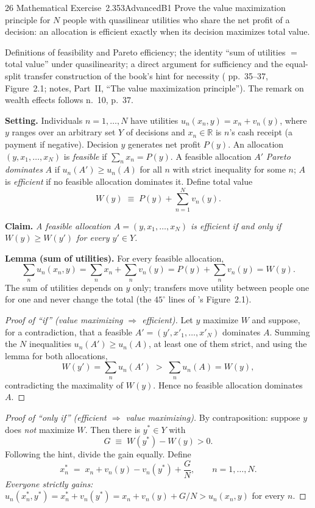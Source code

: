 \begin{exsol}{26}{\MR{} Mathematical Exercise~2.3}{53}{Advanced}{B1}
\asked Prove the value maximization principle for $N$ people with quasilinear utilities who share
the net profit of a decision: an allocation is efficient exactly when its decision maximizes total
value.

\method Definitions of feasibility and Pareto efficiency; the identity ``sum of utilities $=$
total value'' under quasilinearity; a direct argument for sufficiency and the equal-split
transfer construction of the book's hint for necessity (\MR{} pp.~35--37, Figure~2.1; notes,
Part~II, ``The value maximization principle''). The remark on wealth effects follows \MR{}
n.~10, p.~37.

\solution
\textbf{Setting.} Individuals $n = 1, \dots, N$ have utilities $u_n(x_n, y) = x_n + v_n(y)$,
where $y$ ranges over an arbitrary set $Y$ of decisions and $x_n \in \mathbb{R}$ is $n$'s cash
receipt (a payment if negative). Decision $y$ generates net profit $P(y)$. An allocation
$(y, x_1, \dots, x_N)$ is \emph{feasible} if $\sum_{n} x_n = P(y)$. A feasible allocation $A'$
\emph{Pareto dominates} $A$ if $u_n(A') \ge u_n(A)$ for all $n$ with strict inequality for some
$n$; $A$ is \emph{efficient} if no feasible allocation dominates it. Define total value
\[
  W(y) \;\equiv\; P(y) + \sum_{n=1}^{N} v_n(y).
\]

\textbf{Claim.} \emph{A feasible allocation $A = (y, x_1, \dots, x_N)$ is efficient if and only
if $W(y) \ge W(y')$ for every $y' \in Y$.}

\textbf{Lemma (sum of utilities).} For every feasible allocation,
\[
  \sum_n u_n(x_n, y) = \sum_n x_n + \sum_n v_n(y) = P(y) + \sum_n v_n(y) = W(y).
\]
The sum of utilities depends on $y$ only; transfers move utility between people one for one and
never change the total (the $45^\circ$ lines of \MR's Figure~2.1).

\begin{proof}[Proof of ``if'' (value maximizing $\Rightarrow$ efficient)]
Let $y$ maximize $W$ and suppose, for a contradiction, that a feasible
$A' = (y', x'_1, \dots, x'_N)$ dominates $A$. Summing the $N$ inequalities
$u_n(A') \ge u_n(A)$, at least one of them strict, and using the lemma for both allocations,
\[
  W(y') = \sum_n u_n(A') \;>\; \sum_n u_n(A) = W(y),
\]
contradicting the maximality of $W(y)$. Hence no feasible allocation dominates $A$.
\end{proof}

\begin{proof}[Proof of ``only if'' (efficient $\Rightarrow$ value maximizing)]
By contraposition: suppose $y$ does \emph{not} maximize $W$. Then there is $y^* \in Y$ with
\[
  G \;\equiv\; W(y^*) - W(y) > 0 .
\]
Following the hint, divide the gain equally. Define
\[
  x^*_n \;=\; x_n + v_n(y) - v_n(y^*) + \frac{G}{N}, \qquad n = 1, \dots, N .
\]
\emph{Everyone strictly gains:}
$u_n(x^*_n, y^*) = x^*_n + v_n(y^*) = x_n + v_n(y) + G/N > u_n(x_n, y)$ for every $n$.


\end{proof}
\end{exsol}
